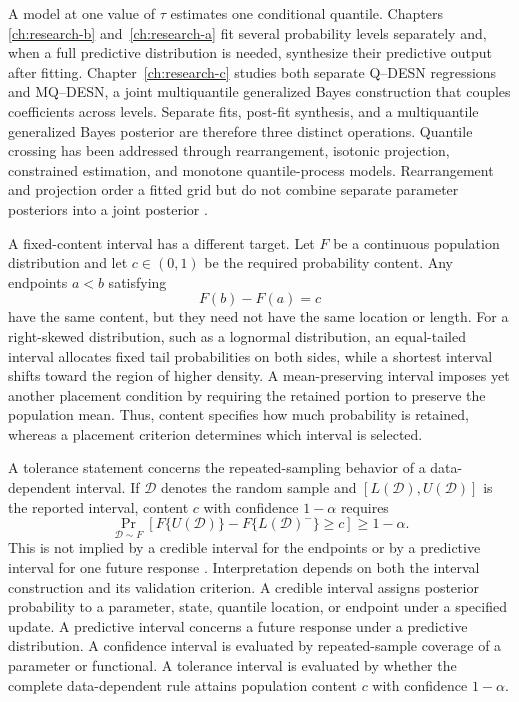 A model at one value of \(\tau\) estimates one conditional quantile. Chapters
\ref{ch:research-b} and~\ref{ch:research-a} fit several probability levels
separately and, when a full predictive distribution is needed, synthesize
their predictive output after fitting. Chapter~\ref{ch:research-c} studies
both separate Q--DESN regressions and MQ--DESN, a joint multiquantile
generalized Bayes construction that couples coefficients across levels.
Separate fits, post-fit synthesis, and a multiquantile generalized Bayes
posterior are therefore three distinct operations. Quantile crossing has been
addressed through rearrangement, isotonic projection, constrained estimation,
and monotone quantile-process models. Rearrangement and projection order a
fitted grid but do not combine separate parameter posteriors into a joint
posterior
\citep{qdesn-BarlowBrunk1972IsotonicDual,exd-chernozhukov2010,
qdesn-WuLiu2009StepwiseNCQR,qdesn-BondellReichWang2010NoncrossingQR,
qdesn-YangTokdar2017JointQuantilePlanes}.

A fixed-content interval has a different target. Let \(F\) be a continuous
population distribution and let \(c\in(0,1)\) be the required probability
content. Any endpoints \(a<b\) satisfying
\begin{equation}
F(b)-F(a)=c
\label{eq:intro-fixed-content}
\end{equation}
have the same content, but they need not have the same location or length.
For a right-skewed distribution, such as a lognormal distribution, an
equal-tailed interval allocates fixed tail probabilities on both sides, while
a shortest interval shifts toward the region of higher density. A
mean-preserving interval imposes yet another placement condition by requiring
the retained portion to preserve the population mean. Thus, content specifies
how much probability is retained, whereas a placement criterion determines
which interval is selected.

A tolerance statement concerns the repeated-sampling behavior of a
data-dependent interval. If \(\mathcal D\) denotes the random sample and
\([L(\mathcal D),U(\mathcal D)]\) is the reported interval, content \(c\) with
confidence \(1-\alpha\) requires
\begin{equation}
\Pr_{\mathcal D\sim F}
\left[
F\{U(\mathcal D)\}-F\{L(\mathcal D)^-\}\ge c
\right]\ge 1-\alpha.
\label{eq:intro-tolerance-statement}
\end{equation}
This is not implied by a credible interval for the endpoints or by a predictive
interval for one future response
\citep{rqr-Wilks1941ToleranceLimits,rqr-Wilks1942StatisticalPrediction,
rqr-Robbins1944DistributionFreeTolerance}. Interpretation depends on both the
interval construction and its validation criterion. A credible interval
assigns posterior
probability to a parameter, state, quantile location, or endpoint under a
specified update. A predictive interval concerns a future response under a
predictive distribution. A confidence interval is evaluated by repeated-sample
coverage of a parameter or functional. A tolerance interval is evaluated by
whether the complete data-dependent rule attains population content \(c\) with
confidence \(1-\alpha\).

